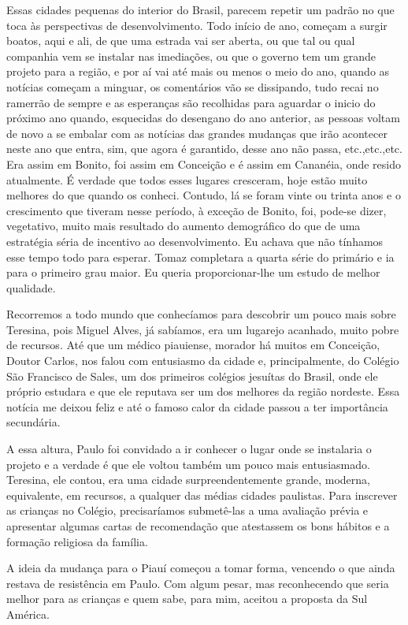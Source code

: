 Essas cidades pequenas do interior do Brasil, parecem repetir um padrão no que toca às perspectivas de desenvolvimento.
Todo início de ano, começam a surgir boatos, aqui e ali, de que uma estrada vai ser aberta, ou que tal ou qual companhia vem se instalar nas imediações, ou que o governo tem um grande projeto para a região, e por aí vai até mais ou menos o meio do ano, quando as notícias começam a minguar, os comentários vão se dissipando, tudo recai no ramerrão de sempre e as esperanças são recolhidas para aguardar o inicio do próximo ano quando, esquecidas do desengano do ano anterior, as pessoas voltam de novo a se embalar com as notícias das grandes mudanças que irão acontecer neste ano que entra, sim, que agora é garantido, desse ano não passa, etc.,etc.,etc.
Era assim em Bonito, foi assim em Conceição e é assim em Cananéia, onde resido atualmente.
É verdade que todos esses lugares cresceram, hoje estão muito melhores do que quando os conheci.
Contudo, lá se foram vinte ou trinta anos e o crescimento que tiveram nesse período, à exceção de Bonito, foi, pode-se dizer, vegetativo, muito mais resultado do aumento demográfico do que de uma estratégia séria de incentivo ao desenvolvimento.
Eu achava que não tínhamos esse tempo todo para esperar.
Tomaz completara a quarta série do primário e ia para o primeiro grau maior.
Eu queria proporcionar-lhe um estudo de melhor qualidade.

Recorremos a todo mundo que conhecíamos para descobrir um pouco mais sobre Teresina, pois Miguel Alves, já sabíamos, era um lugarejo acanhado, muito pobre de recursos.
Até que um médico piauiense, morador há muitos em Conceição, Doutor Carlos, nos falou com entusiasmo da cidade e, principalmente, do Colégio São Francisco de Sales, um dos primeiros colégios jesuítas do Brasil, onde ele próprio estudara e que ele reputava ser um dos melhores da região nordeste.
Essa notícia me deixou feliz e até o famoso calor da cidade passou a ter importância secundária.


A essa altura, Paulo foi convidado a ir conhecer o lugar onde se instalaria o projeto e a verdade é que ele voltou também um pouco mais entusiasmado.
Teresina, ele contou, era uma cidade surpreendentemente grande, moderna, equivalente, em recursos, a qualquer das médias cidades paulistas.
Para inscrever as crianças no Colégio, precisaríamos submetê-las a uma avaliação prévia e apresentar algumas cartas de recomendação que atestassem os bons hábitos e a formação religiosa da família.

A ideia da mudança para o Piauí começou a tomar forma, vencendo o que ainda restava de resistência em Paulo.
Com algum pesar, mas reconhecendo que seria melhor para as crianças e quem sabe, para mim, aceitou a proposta da Sul América.

